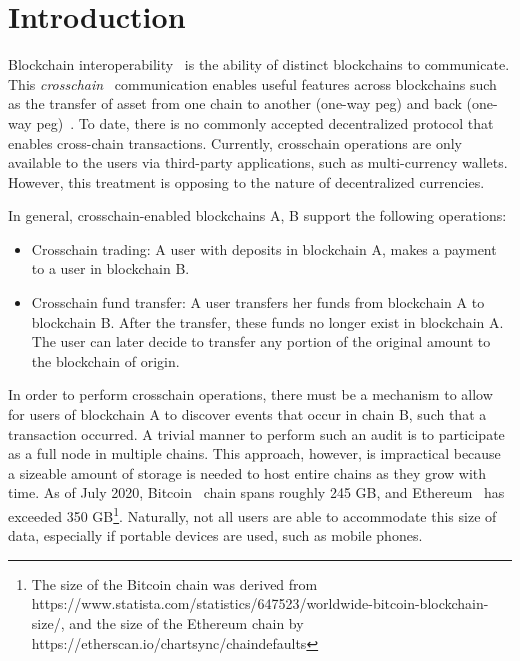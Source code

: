 \section{Introduction}

Blockchain interoperability~\cite{dionyziz} is the ability of distinct
blockchains to communicate.  This \emph{crosschain}~\cite{pow-sidechains,
pos-sidechains,burn,crosschain-sok, gtklocker} communication enables useful
features across blockchains such as the transfer of asset from one chain to
another (one-way peg) and back (one-way peg)~\cite{pow-sidechains}. To date,
there is no commonly accepted decentralized protocol that enables cross-chain
transactions. Currently, crosschain operations are only available to the users
via third-party applications, such as multi-currency wallets. However, this
treatment is opposing to the nature of decentralized currencies.

\noindent

In general, crosschain-enabled blockchains A, B support the following
operations:

\begin{itemize}
\item Crosschain trading: A user with deposits in blockchain A, makes a
    payment to a user in blockchain B.
\item Crosschain fund transfer: A user transfers her funds from blockchain
    A to blockchain B. After the transfer, these funds no longer exist in
    blockchain A. The user can later decide to transfer any portion of the
    original amount to the blockchain of origin.
\end{itemize}


\noindent

In order to perform crosschain operations, there must be a mechanism to allow
for users of blockchain A to discover events that occur in chain B, such that a
transaction occurred. A trivial manner to perform such an audit is to
participate as a full node in multiple chains. This approach, however, is
impractical because a sizeable amount of storage is needed to host entire
chains as they grow with time. As of July 2020, Bitcoin~\cite{nakamoto} chain
spans roughly 245 GB, and Ethereum~\cite{wood, buterin} has exceeded 350
GB\footnote{The size of the Bitcoin chain was derived from
    https://www.statista.com/statistics/647523/worldwide-bitcoin-blockchain-size/,
    and the size of the Ethereum chain by
https://etherscan.io/chartsync/chaindefaults}. Naturally, not all users are
able to accommodate this size of data, especially if portable devices are used,
such as mobile phones.

